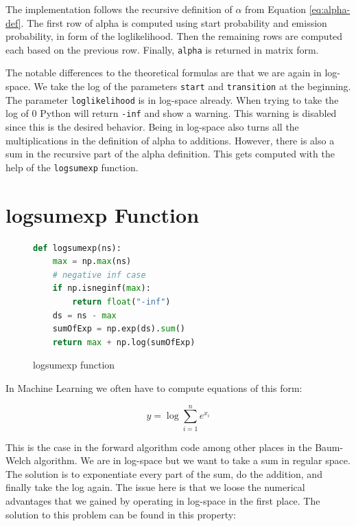 The implementation follows the recursive definition of $\alpha$ from Equation \eqref{eq:alpha-def}. The first row of alpha is computed using start probability and emission probability, in form of the loglikelihood. Then the remaining rows are computed each based on the previous row. Finally, \texttt{alpha} is returned in matrix form. 

The notable differences to the theoretical formulas are that we are again in log-space. We take the log of the parameters \texttt{start} and \texttt{transition} at the beginning. The parameter \texttt{loglikelihood} is in log-space already. When trying to take the log of 0 Python will return \texttt{-inf} and show a warning. This warning is disabled since this is the desired behavior. Being in log-space also turns all the multiplications in the definition of alpha to additions. However, there is also a sum in the recursive part of the alpha definition. This gets computed with the help of the \texttt{logsumexp} function. 

\section{logsumexp Function}

\begin{figure}
\begin{singlespace}
\begin{lstlisting}[language=Python]
def logsumexp(ns):
    max = np.max(ns)
    # negative inf case
    if np.isneginf(max):
        return float("-inf")
    ds = ns - max
    sumOfExp = np.exp(ds).sum()
    return max + np.log(sumOfExp)

\end{lstlisting}
\end{singlespace}
\caption{logsumexp function}    
\label{fig:logsumexp-listing}
\end{figure}

In Machine Learning we often have to compute equations of this form: 

\begin{equation}
y=\log \sum_{i=1}^{n} e^{x_{i}}
\end{equation}

This is the case in the forward algorithm code among other places in the Baum-Welch algorithm. We are in log-space but we want to take a sum in regular space. The solution is to exponentiate every part of the sum, do the addition, and finally take the log again. The issue here is that we loose the numerical advantages that we gained by operating in log-space in the first place. The solution to this problem can be found in this property:

